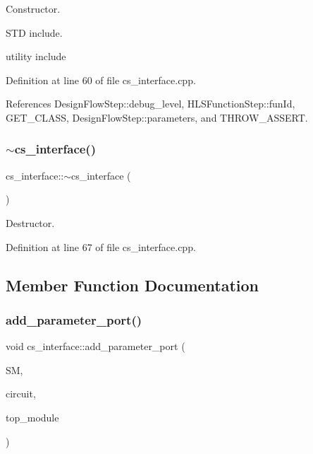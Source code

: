 Constructor. 

S\+TD include.

utility include 

Definition at line 60 of file cs\+\_\+interface.\+cpp.



References Design\+Flow\+Step\+::debug\+\_\+level, H\+L\+S\+Function\+Step\+::fun\+Id, G\+E\+T\+\_\+\+C\+L\+A\+SS, Design\+Flow\+Step\+::parameters, and T\+H\+R\+O\+W\+\_\+\+A\+S\+S\+E\+RT.

\mbox{\label{classcs__interface_a16aecb185035e2abca9409d01c829510}} 
\subsubsection{\texorpdfstring{$\sim$cs\+\_\+interface()}{~cs\_interface()}}
{\footnotesize\ttfamily cs\+\_\+interface\+::$\sim$cs\+\_\+interface (\begin{DoxyParamCaption}{ }\end{DoxyParamCaption})\hspace{0.3cm}{\ttfamily [virtual]}}



Destructor. 



Definition at line 67 of file cs\+\_\+interface.\+cpp.



\subsection{Member Function Documentation}
\mbox{\label{classcs__interface_ab357b22ce264cfcbf7c82e74b5c7259d}} 
\subsubsection{\texorpdfstring{add\+\_\+parameter\+\_\+port()}{add\_parameter\_port()}}
{\footnotesize\ttfamily void cs\+\_\+interface\+::add\+\_\+parameter\+\_\+port (\begin{DoxyParamCaption}\item[{const \hyperlink{structural__manager_8hpp_ab3136f0e785d8535f8d252a7b53db5b5}{structural\+\_\+manager\+Ref}}]{SM,  }\item[{\hyperlink{structural__objects_8hpp_a8ea5f8cc50ab8f4c31e2751074ff60b2}{structural\+\_\+object\+Ref}}]{circuit,  }\item[{\hyperlink{structural__objects_8hpp_a8ea5f8cc50ab8f4c31e2751074ff60b2}{structural\+\_\+object\+Ref}}]{top\+\_\+module }\end{DoxyParamCaption})\hspace{0.3cm}{\ttfamily [protected]}}



